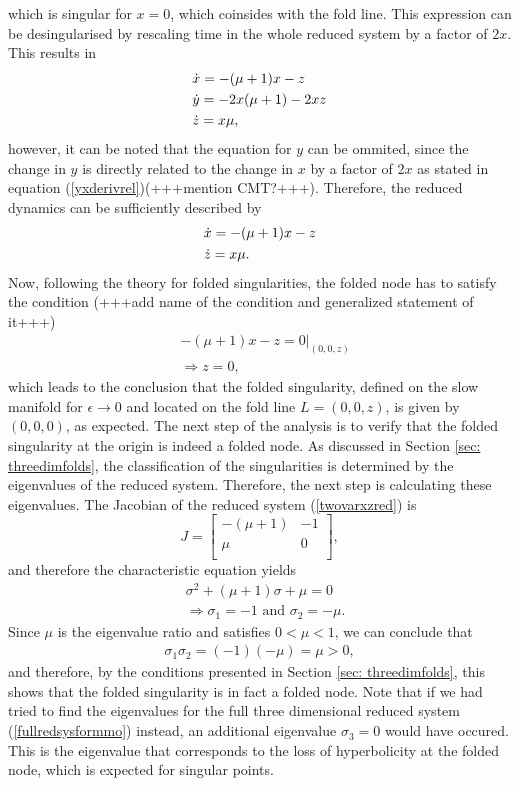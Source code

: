 which is singular for $x=0$, which coinsides with the fold line.
This expression can be desingularised by rescaling time in the whole reduced system by a factor of $2x$. This results in
\begin{align} \label{fullredsysformmo}
&\dot{x} = -(\mu+1)x - z \notag \\
&\dot{y} = - 2x (\mu +1) -2xz\\
&\dot{z} = x \mu \notag,
\end{align}
however, it can be noted that the equation for $y$ can be ommited, since the change in $y$ is directly related to the change in $x$ by a factor of $2x$ as stated in equation (\ref{yxderivrel})(+++mention CMT?+++). Therefore, the reduced dynamics can be sufficiently described by
\begin{align}\label{twovarxzred}
&\dot{x} = -(\mu+1)x - z\\
&\dot{z} = x \mu. \notag
\end{align}
Now, following the theory for folded singularities, the folded node has to satisfy the condition (+++add name of the condition and generalized statement of it+++)
\begin{align*}
& -(\mu+1)x - z=0 |_{(0,0,z)}\\
&\Rightarrow z=0,
\end{align*}
which leads to the conclusion that the folded singularity, defined on the slow manifold for $\epsilon \to 0$ and located on the fold line $L=(0,0,z)$, is given by $(0,0,0)$, as expected.
The next step of the analysis is to verify that the folded singularity at the origin is indeed a folded node.
As discussed in Section \ref{sec: threedimfolds}, the classification of the singularities is determined by the eigenvalues of the reduced system. Therefore, the next step is calculating these eigenvalues.
The Jacobian of the reduced system (\ref{twovarxzred}) is
\begin{equation}
J=\begin{bmatrix}
-(\mu +1) & -1 \\
\mu & 0 \\
\end{bmatrix},
\end{equation}
and therefore the characteristic equation yields
\begin{align*}
&\sigma^2 +(\mu +1)\sigma + \mu = 0 \\
&\Rightarrow \sigma_1= -1 \textrm{\ \ \ and \ \ \ } \sigma_2 = -\mu.
\end{align*}
Since $\mu$ is the eigenvalue ratio and satisfies $0< \mu < 1$, we can conclude that 
\begin{align*}
\sigma_1\sigma_2 = (-1)(-\mu)=\mu >0,
\end{align*}
and therefore, by the conditions presented in Section \ref{sec: threedimfolds}, this shows that the folded singularity is in fact a folded node.
Note that if we had tried to find the eigenvalues for the full three dimensional reduced system (\ref{fullredsysformmo}) instead, an additional eigenvalue $\sigma_3=0$ would have occured. This is the eigenvalue that corresponds to the loss of hyperbolicity at the folded node, which is expected for singular points.


